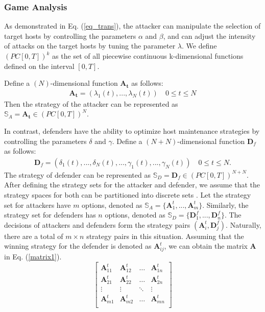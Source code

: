 \documentclass[lettersize,journal]{IEEEtran}
\begin{document}
 \subsubsection{Game Analysis}
As demonstrated in Eq. (\ref{eq_trans}), the attacker can manipulate the selection of target hosts by controlling the parameters $\alpha$ and $\beta$, and can adjust the intensity of attacks on the target hosts by tuning the parameter $\lambda$. We define $(PC[0,T])^{k}$ as the set of all piecewise continuous k-dimensional functions defined on the interval $[0, T]$.\par
Define a $(N)$-dimensional function $\mathbf{A_t}$ as follows: 
\begin{equation}
\label{AttackStrategy}
\begin{split}
\mathbf{A_t}=(\lambda_1(t),...,\lambda_N(t))  \quad 0\leq t \leq N
\end{split}
\end{equation}
Then the strategy of the attacker can be represented as $\mathbb{S}_A=\mathbf{A_t} \in (PC[0,T])^{N}$. \par
In contrast, defenders have the ability to optimize host maintenance strategies by controlling the parameters $\delta$ and $\gamma$. Define a $(N+N)$-dimensional function $\mathbf{D}_f$ as follows:
\begin{equation}
\label{DefenderStrategy}
\begin{split}
\mathbf{D}_f=(\delta_1(t),...,\delta_N(t),...,\gamma_1(t),...,\gamma_N(t))  \quad 0\leq t \leq N .
\end{split}
\end{equation}
The strategy of defender can be represented as $\mathbb{S}_D=\mathbf{D}_f \in (PC[0,T])^{N+N}$. 
After defining the strategy sets for the attacker and defender, we assume that the strategy spaces for both can be partitioned into discrete sets \cite{myerson1991game}. Let the strategy set for attackers have $m$ options, denoted as $\mathbb{S}_A=\{ \mathbf{A}^t_1,...,\mathbf{A}^t_m\}$. Similarly, the strategy set for defenders has $n$ options, denoted as $\mathbb{S}_D=\{ \mathbf{D}^f_1,...,\mathbf{D}^f_n\}$. The decisions of attackers and defenders form the strategy pairs $(\mathbf{A}^t_i,\mathbf{D}^f_j)$. Naturally, there are a total of $m \times n$ strategy pairs in this situation. Assuming that the winning strategy for the defender is denoted as $\mathbf{A}^t_{ij}$, we can obtain the matrix $\mathbf{A}$ in Eq. (\ref{matrix1}).
\begin{equation}
\begin{bmatrix}
\label{matrix1}
\mathbf{A}^t_{11} & \mathbf{A}^t_{12} & \dots & \mathbf{A}^t_{1n} \\
\mathbf{A}^t_{21} & \mathbf{A}^t_{22} & \dots & \mathbf{A}^t_{2n} \\
\vdots & \vdots & \ddots & \vdots \\
\mathbf{A}^t_{m1} & \mathbf{A}^t_{m2} & \dots & \mathbf{A}^t_{mn} \\
\end{bmatrix}
\end{equation}
\end{document}
